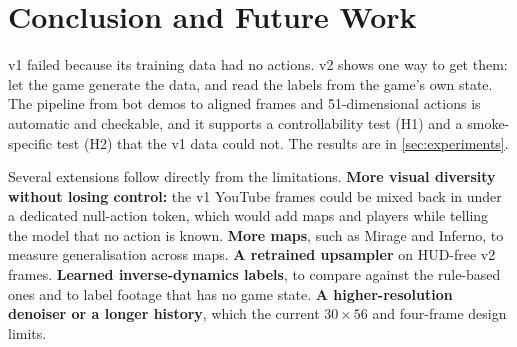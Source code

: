 \section{Conclusion and Future Work}
\label{sec:conclusion}
v1 failed because its training data had no actions.
v2 shows one way to get them: let the game generate the data, and read the labels from the game's own state.
The pipeline from bot demos to aligned frames and 51-dimensional actions is automatic and checkable, and it supports a controllability test (H1) and a smoke-specific test (H2) that the v1 data could not.
The results are in \cref{sec:experiments}.

Several extensions follow directly from the limitations.
\textbf{More visual diversity without losing control:} the v1 YouTube frames could be mixed back in under a dedicated null-action token, which would add maps and players while telling the model that no action is known.
\textbf{More maps}, such as Mirage and Inferno, to measure generalisation across maps.
\textbf{A retrained upsampler} on HUD-free v2 frames.
\textbf{Learned inverse-dynamics labels}, to compare against the rule-based ones and to label footage that has no game state.
\textbf{A higher-resolution denoiser or a longer history}, which the current $30{\times}56$ and four-frame design limits.
